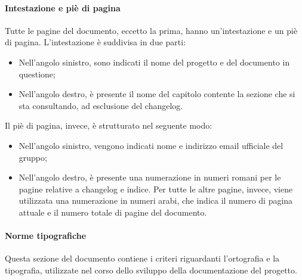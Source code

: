 			\paragraph{Intestazione e piè di pagina}
			Tutte le pagine del documento, eccetto la prima, hanno un'intestazione e un piè di pagina. L'intestazione è suddivisa in due parti:
			\begin{itemize}
				\item Nell'angolo sinistro, sono indicati il nome del progetto e del documento in questione;
				\item Nell'angolo destro, è presente il nome del capitolo contente la sezione che si sta consultando, ad esclusione del changelog.
			\end{itemize}
			Il piè di pagina, invece, è strutturato nel seguente modo:
			\begin{itemize}
				\item Nell'angolo sinistro, vengono indicati nome e indirizzo email ufficiale del gruppo;
				\item Nell'angolo destro, è presente una numerazione in numeri romani per le pagine relative a changelog e indice. Per tutte le altre pagine, invece, viene utilizzata una numerazione in numeri arabi, che indica il numero di pagina attuale e il numero totale di pagine del documento.
			\end{itemize} 

			\paragraph{Norme tipografiche}
			Questa sezione del documento contiene i criteri riguardanti l'ortografia e la tipografia, utilizzate nel corso dello sviluppo della documentazione del progetto.

